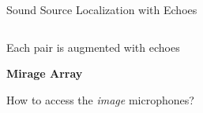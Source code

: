 \begin{frame}[t]{Sound Source Localization \alert{with Echoes} \hfill\faMapMarked*}
\begin{columns}[T,onlytextwidth]
\begin{column}{0.5\textwidth}
        \end{column}
    \end{columns}

    \pause[3]
    \vfill
    \begin{columns}[T,onlytextwidth]

        \begin{column}{0.5\textwidth}
            \begin{block}{Each pair is augmented with echoes}
                \begin{center}
                    \textcolor{myred}{\textbf{Mirage Array}}
                    \\
                \end{center}
            How to access the \textit{image} microphones?
            \end{block}
        \end{column}


\end{columns}
\end{frame}
